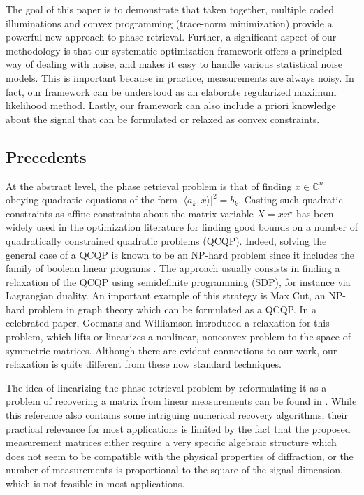 \documentclass[11pt]{article}
\newcommand{\C}{\mathbb{C}}
\newcommand{\<}{\langle}
\renewcommand{\>}{\rangle}
\numberwithin{equation}{section}
\begin{document}
The goal of this paper is to demonstrate that taken together, multiple
coded illuminations and convex programming (trace-norm minimization)
provide a powerful new approach to phase retrieval. Further, a
significant aspect of our methodology is that our systematic
optimization framework offers a principled way of dealing with noise,
and makes it easy to handle various statistical noise models. This is
important because in practice, measurements are always noisy.  In
fact, our framework can be understood as an elaborate regularized
maximum likelihood method. Lastly, our framework can also include
a priori knowledge about the signal that can be formulated or relaxed
as convex constraints.

\subsection{Precedents}
\label{sec:precedents}

At the abstract level, the phase retrieval problem is that of finding
$x \in \C^n$ obeying quadratic equations of the form $|\<a_k, x\>|^2 =
b_k$. Casting such quadratic constraints as affine constraints about
the matrix variable $X = x x^\star$ has been widely used in the
optimization literature for finding good bounds on a number of
quadratically constrained quadratic problems (QCQP). Indeed, solving
the general case of a QCQP is known to be an NP-hard problem since it
includes the family of boolean linear programs \cite{BenTalNem}.  The
approach usually consists in finding a relaxation of the QCQP using
semidefinite programming (SDP), for instance via Lagrangian
duality. An important example of this strategy is Max Cut, an NP-hard
problem in graph theory which can be formulated as a QCQP.  In a
celebrated paper, Goemans and Williamson introduced a relaxation
\cite{GoemansWilliamson} for this problem, which lifts or linearizes a
nonlinear, nonconvex problem to the space of symmetric
matrices. Although there are evident connections to our work, our
relaxation is quite different from these now standard techniques.

The idea of linearizing the phase retrieval problem by reformulating it as a
problem of recovering a matrix from linear measurements can be found
in \cite{BBC09}. While this reference also contains some intriguing
numerical recovery algorithms, their practical relevance for most
applications is limited by the fact that the proposed measurement
matrices either require a very specific algebraic structure which does not
seem to be compatible with the physical properties of diffraction,
or the number of measurements is proportional to the square of the signal
dimension, which is not feasible in most applications.
\end{document}
